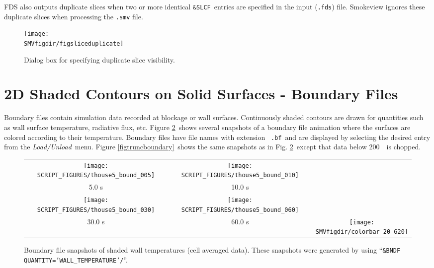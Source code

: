 \documentclass[11pt,twoside]{book}
\newcommand{\figheightAbar}{2.2in}
\begin{document}
FDS also outputs duplicate slices when two or more identical {\tt \&SLCF}\ entries are specified in the input ({\tt .fds}) file.  Smokeview ignores these duplicate slices when processing the {\tt .smv} file.

\begin{figure}[bph]
\centerline{
\texttt{[image: \\SMVfigdir/figsliceduplicate]}
}
\caption[Dialog box for specifying duplicate slice visibility.]{Dialog box for specifying duplicate slice visibility.}
\label{fig:sliceduplicate}
\end{figure}


\section{2D Shaded Contours on Solid Surfaces - Boundary Files}
\label{section:bf}
Boundary files contain simulation data recorded at blockage or
wall surfaces. Continuously shaded contours are drawn for
quantities such as wall surface temperature, radiative flux, etc.
Figure \ref{figboundary}\ shows several snapshots of a boundary
file animation where the surfaces are colored according to their
temperature. Boundary files have file names with extension {\tt
.bf}\ and are displayed by selecting the desired entry from the
{\em Load/Unload}\  menu. Figure \ref{figtruncboundary}\ shows the
same snapshots as in Fig. \ref{figboundary}\ except that data
below 200~\degC\ is chopped.
\begin{figure}[bph]
\begin{center}
\begin{tabular}{ccc}
\texttt{[image: SCRIPT\_FIGURES/thouse5\_bound\_005]}&
\texttt{[image: SCRIPT\_FIGURES/thouse5\_bound\_010]}\\
5.0 s&10.0 s\\
\texttt{[image: SCRIPT\_FIGURES/thouse5\_bound\_030]}&
\texttt{[image: SCRIPT\_FIGURES/thouse5\_bound\_060]}\\
30.0 s&60.0 s
&\raisebox{0.0ex}[0pt]{\texttt{[image: \\SMVfigdir/colorbar\_20\_620]}}\\
\end{tabular}
\end{center}
\caption [Boundary file snapshots of shaded wall temperatures
contours (cell averaged data).] {Boundary file snapshots of shaded
wall temperatures (cell averaged data). These snapshots were
generated by using ``{\tt\&BNDF QUANTITY='WALL\_TEMPERATURE'/}''.
}
\label{figboundary}%
\end{figure}
\end{document}
